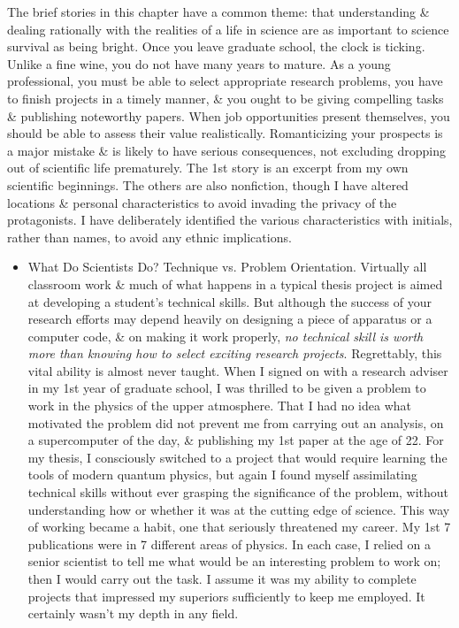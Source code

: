 \documentclass{article}
\begin{document}
\begin{enumerate}
\begin{itemize}
		The brief stories in this chapter have a common theme: that understanding \& dealing rationally with the realities of a life in science are as important to science survival as being bright. Once you leave graduate school, the clock is ticking. Unlike a fine wine, you do not have many years to mature. As a young professional, you must be able to select appropriate research problems, you have to finish projects in a timely manner, \& you ought to be giving compelling tasks \& publishing noteworthy papers. When job opportunities present themselves, you should be able to assess their value realistically. Romanticizing your prospects is a major mistake \& is likely to have serious consequences, not excluding dropping out of scientific life prematurely. The 1st story is an excerpt from my own scientific beginnings. The others are also nonfiction, though I have altered locations \& personal characteristics to avoid invading the privacy of the protagonists. I have deliberately identified the various characteristics with initials, rather than names, to avoid any ethnic implications.
		\begin{itemize}
			\item {\sf What Do Scientists Do? Technique vs. Problem Orientation.} Virtually all classroom work \& much of what happens in a typical thesis project is aimed at developing a student's technical skills. But although the success of your research efforts may depend heavily on designing a piece of apparatus or a computer code, \& on making it work properly, {\it no technical skill is worth more than knowing how to select exciting research projects}. Regrettably, this vital ability is almost never taught. When I signed on with a research adviser in my 1st year of graduate school, I was thrilled to be given a problem to work in the physics of the upper atmosphere. That I had no idea what motivated the problem did not prevent me from carrying out an analysis, on a supercomputer of the day, \& publishing my 1st paper at the age of 22. For my thesis, I consciously switched to a project that would require learning the tools of modern quantum physics, but again I found myself assimilating technical skills without ever grasping the significance of the problem, without understanding how or whether it was at the cutting edge of science. This way of working became a habit, one that seriously threatened my career. My 1st 7 publications were in 7 different areas of physics. In each case, I relied on a senior scientist to tell me what would be an interesting problem to work on; then I would carry out the task. I assume it was my ability to complete projects that impressed my superiors sufficiently to keep me employed. It certainly wasn't my depth in any field.


\end{itemize}
\end{itemize}
\end{enumerate}
\end{document}
